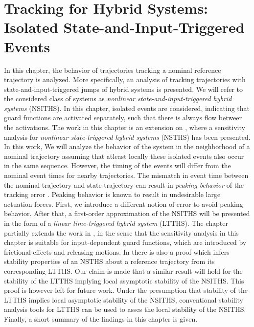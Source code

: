 \documentclass[../DC2017114Bouma.tex]{subfiles}
\begin{document}
\graphicspath{{03_Contribution/img/}}
\renewcommand{\chaptermark}[1]{\markboth{\thechapter.\ #1}{}}
\renewcommand{\sectionmark}[1]{\markright{#1}{}}

\pagestyle{fancyreport}
\cleartooddpage
\pagestyle{fancyreport}
\chapter{Tracking for Hybrid Systems: Isolated State-and-Input-Triggered Events}\label{ch:order}
In this chapter, the behavior of trajectories tracking a nominal reference trajectory is analyzed. More specifically, an analysis of tracking trajectories with state-and-input-triggered jumps of hybrid systems is presented. We will refer to the considered class of systems as \textit{nonlinear state-and-input-triggered hybrid systems} (NSITHS). In this chapter, isolated events are considered, indicating that guard functions are activated separately, such that there is always flow between the activations. The work in this chapter is an extension on \cite{Saccon2014,Rijnen2017}, where a sensitivity analysis for \textit{nonlinear state-triggered hybrid systems} (NSTHS) has been presented. In this work, We will analyze the behavior of the system in the neighborhood of a nominal trajectory assuming that atleast locally these isolated events also occur in the same sequence. However, the timing of the events will differ from the nominal event times for nearby trajectories. The mismatch in event time between the nominal trajectory and state trajectory can result in \textit{peaking behavior} of the tracking error \cite{Menini2001,Biemond2013}. Peaking behavior is known to result in undesirable large actuation forces. First, we introduce a different notion of error to avoid peaking behavior. After that, a first-order approximation of the NSITHS will be presented in the form of a \textit{linear time-triggered hybrid system} (LTTHS). The chapter partially extends the work in \cite{Rijnen2017}, in the sense that the sensitivity analysis in this chapter is suitable for input-dependent guard functions, which are introduced by frictional effects and releasing motions. In \cite{Rijnen2017} there is also a proof which infers stability properties of an NSTHS about a reference trajectory from its corresponding LTTHS. Our claim is made that a similar result will hold for the stability of the LTTHS implying local asymptotic stability of the NSITHS. This proof is however left for future work. Under the presumption that stability of the LTTHS implies local asymptotic stability of the NSITHS, conventional stability analysis tools for LTTHS can be used to asses the local stability of the NSITHS. Finally, a short summary of the findings in this chapter is given.
%
%
\end{document}
